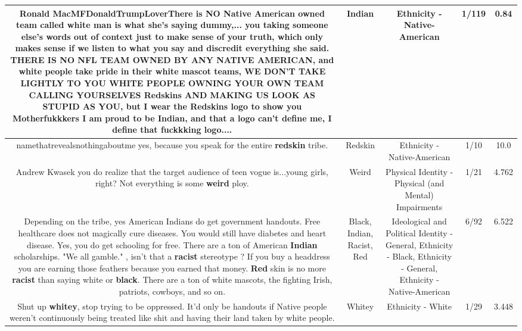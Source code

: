 \documentclass[11pt]{article}
\newlength\mylength
\begin{document}
\begin{center}
\begin{longtable}{|C{.65\mylength}|C{.30\mylength}|C{.12\mylength}|C{.12\mylength}|C{.12\mylength}|}
  \small Ronald MacMFDonaldTrumpLoverThere is NO Native American owned team called white man is what she's saying dummy,... you taking someone else's words out of context just to make sense of your truth, which only makes sense if we listen to what you say and discredit everything she said. THERE IS NO NFL TEAM OWNED BY ANY NATIVE AMERICAN, and white people take pride in their white mascot teams, WE DON'T TAKE LIGHTLY TO YOU WHITE PEOPLE OWNING YOUR OWN TEAM CALLING YOURSELVES Redskins AND MAKING US LOOK AS STUPID AS YOU, but I wear the Redskins logo to show you Motherfukkkers I am proud to be \textbf{Indian}, and that a logo can't define me, I define that fuckkking logo....\normalsize   & Indian & Ethnicity - Native-American & 1/119 & 0.84 \\  \hline
  \small namethatrevealsnothingaboutme yes, because you speak for the entire \textbf{redskin} tribe.\normalsize   & Redskin & Ethnicity - Native-American & 1/10 & 10.0 \\  \hline
  \small Andrew Kwasek you do realize that the target audience of teen vogue is...young girls, right? Not everything is some \textbf{weird} ploy.\normalsize   & Weird & Physical Identity - Physical (and Mental) Impairments & 1/21 & 4.762 \\  \hline
  \small Depending on the tribe, yes American Indians do get government handouts. Free healthcare does not magically cure diseases. You would still have diabetes and heart disease.  Yes, you do get schooling for free. There are a ton of American \textbf{Indian} scholarships. "We all gamble." , isn't that a \textbf{racist} stereotype ? If you buy a headdress you are earning those feathers because you earned that money. \textbf{R\textbf{ed}} skin is no more \textbf{racist} than saying white or \textbf{black}. There are a ton of white mascots, the fighting Irish, patriots, cowboys, and so on.\normalsize   & Black, Indian, Racist, Red &  Ideological and Political Identity - General, Ethnicity - Black, Ethnicity - General, Ethnicity - Native-American & 6/92 & 6.522 \\  \hline
  \small Shut up \textbf{whitey}, stop trying to be oppressed. It'd only be handouts if Native people weren't continuously being treated like shit and having their land taken by white people.\normalsize   & Whitey & Ethnicity - White & 1/29 & 3.448 \\  \hline

\end{longtable}
\end{center}
\end{document}
